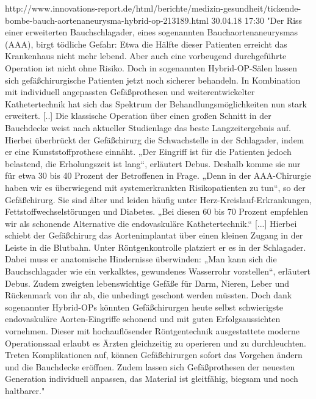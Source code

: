 http://www.innovations-report.de/html/berichte/medizin-gesundheit/tickende-bombe-bauch-aortenaneurysma-hybrid-op-213189.html 30.04.18 17:30
	"Der Riss einer erweiterten Bauchschlagader, eines sogenannten Bauchaortenaneurysmas (AAA), birgt tödliche Gefahr: Etwa die Hälfte dieser Patienten erreicht das Krankenhaus nicht mehr lebend.
	Aber auch eine vorbeugend durchgeführte Operation ist nicht ohne Risiko. Doch in sogenannten Hybrid-OP-Sälen lassen sich gefäßchirurgische Patienten jetzt noch sicherer behandeln. In Kombination mit individuell angepassten Gefäßprothesen und weiterentwickelter Kathetertechnik hat sich das Spektrum der Behandlungsmöglichkeiten nun stark erweitert. [..]
	Die klassische Operation über einen großen Schnitt in der Bauchdecke weist nach aktueller Studienlage das beste Langzeitergebnis auf. Hierbei überbrückt der Gefäßchirurg die Schwachstelle in der Schlagader, indem er eine Kunststoffprothese einnäht.
	„Der Eingriff ist für die Patienten jedoch belastend, die Erholungszeit ist lang“, erläutert Debus. Deshalb komme sie nur für etwa 30 bis 40 Prozent der Betroffenen in Frage. „Denn in der AAA-Chirurgie haben wir es überwiegend mit systemerkrankten Risikopatienten zu tun“, so der Gefäßchirurg. Sie sind älter und leiden häufig unter Herz-Kreislauf-Erkrankungen, Fettstoffwechselstörungen und Diabetes. „Bei diesen 60 bis 70 Prozent empfehlen wir als schonende Alternative die endovaskuläre Kathetertechnik.“
	[...]
	Hierbei schiebt der Gefäßchirurg das Aortenimplantat über einen kleinen Zugang in der Leiste in die Blutbahn. Unter Röntgenkontrolle platziert er es in der Schlagader. Dabei muss er anatomische Hindernisse überwinden: „Man kann sich die Bauchschlagader wie ein verkalktes, gewundenes Wasserrohr vorstellen“, erläutert Debus. Zudem zweigten lebenswichtige Gefäße für Darm, Nieren, Leber und Rückenmark von ihr ab, die unbedingt geschont werden müssten. Doch dank sogenannter Hybrid-OPs könnten Gefäßchirurgen heute selbst schwierigste endovaskuläre Aorten-Eingriffe schonend und mit guten Erfolgsaussichten vornehmen.
	Dieser mit hochauflösender Röntgentechnik ausgestattete moderne Operationssaal erlaubt es Ärzten gleichzeitig zu operieren und zu durchleuchten. Treten Komplikationen auf, können Gefäßchirurgen sofort das Vorgehen ändern und die Bauchdecke eröffnen. Zudem lassen sich Gefäßprothesen der neuesten Generation individuell anpassen, das Material ist gleitfähig, biegsam und noch haltbarer."
	



